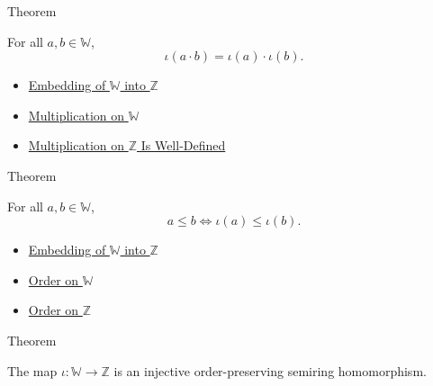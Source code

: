 \begin{theorembox}{Theorem}
\begin{theorem}
\label{thm:embedding-w-into-z-preserves-multiplication}
For all $a,b\in\mathbb{W}$,
\[
\iota(a\cdot b)=\iota(a)\cdot\iota(b).
\]
\end{theorem}
\end{theorembox}

\begin{dependencies}
\begin{itemize}
  \item \hyperref[def:canonical-embedding-w-into-z]{Embedding of $\mathbb{W}$ into $\mathbb{Z}$}
  \item \hyperref[def:multiplication-on-w]{Multiplication on $\mathbb{W}$}
  \item \hyperref[thm:multiplication-on-z-well-defined]{Multiplication on $\mathbb{Z}$ Is Well-Defined}
\end{itemize}
\end{dependencies}

\begin{theorembox}{Theorem}
\begin{theorem}
\label{thm:embedding-w-into-z-preserves-order}
For all $a,b\in\mathbb{W}$,
\[
a\le b \Longleftrightarrow \iota(a)\le\iota(b).
\]
\end{theorem}
\end{theorembox}

\begin{dependencies}
\begin{itemize}
  \item \hyperref[def:canonical-embedding-w-into-z]{Embedding of $\mathbb{W}$ into $\mathbb{Z}$}
  \item \hyperref[def:order-on-w]{Order on $\mathbb{W}$}
  \item \hyperref[def:order-on-z]{Order on $\mathbb{Z}$}
\end{itemize}
\end{dependencies}

\begin{theorembox}{Theorem}
\begin{theorem}
\label{thm:w-embeds-into-z}
The map $\iota:\mathbb{W}\to\mathbb{Z}$ is an injective order-preserving
semiring homomorphism.
\end{theorem}
\end{theorembox}


